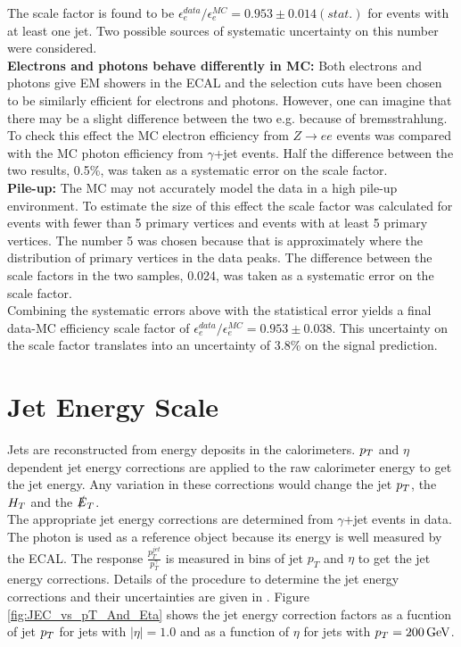 The scale factor is found to be $\epsilon_{e}^{data}/\epsilon_{e}^{MC} =
0.953\pm 0.014(stat.)$ for events with at least one jet. Two possible sources
of systematic uncertainty on this number were considered. \\

{\bf Electrons and photons behave differently in MC:} Both electrons and photons
give EM showers in the ECAL and the selection cuts have been chosen to be
similarly efficient for electrons and photons. However, one can imagine that
there may be a slight difference between the two e.g. because of bremsstrahlung.
To check this effect the MC electron efficiency from $Z\rightarrow ee$ events
was compared with the MC photon efficiency from $\gamma$+jet events. Half the
difference between the two results, 0.5\unit{\%}, was taken as a systematic 
error on the scale factor. \\

{\bf Pile-up:} The MC may not accurately model the data in a high pile-up
environment. To estimate the size of this effect the scale factor was calculated
for events with fewer than 5 primary vertices and events with at least 5 primary
vertices. The number 5 was chosen because that is approximately where the 
distribution of primary vertices in the data peaks. The difference between the
scale factors in the two samples, 0.024, was taken as a systematic error on the 
scale factor. \\

Combining the systematic errors above with the statistical error yields a final
data-MC efficiency scale factor of $\epsilon_{e}^{data}/\epsilon_{e}^{MC} =
0.953\pm0.038$. This uncertainty on the scale factor translates into an 
uncertainty of 3.8\% on the signal prediction.

\section{Jet Energy Scale}

Jets are reconstructed from energy deposits in the calorimeters. $p_{T}$ and
$\eta$ dependent jet energy corrections are applied to the raw calorimeter 
energy to get the jet energy. Any variation in these corrections would change 
the jet $p_{T}$, the $H_{T}$ and the $\slashed{E}_{T}$. \\

The appropriate jet energy corrections are determined from $\gamma$+jet events
in data. The photon is used as a reference object because its energy is well 
measured by the ECAL. The response $\frac{p_{T}^{jet}}{p_{T}^{\gamma}}$
is measured in bins of jet $p_{T}$ and $\eta$ to get the jet energy corrections. 
Details of the procedure to determine the jet energy corrections and their 
uncertainties are given in \cite{jec}. Figure \ref{fig:JEC_vs_pT_And_Eta} shows 
the jet energy correction factors as a fucntion of jet $p_{T}$ for jets with 
$|\eta| = 1.0$ and as a function of $\eta$ for jets with $p_{T} = 200 \, \mathrm{GeV}$. 
\\

